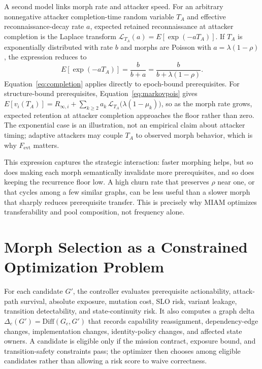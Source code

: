 \documentclass[11pt,letterpaper]{article}
\begin{document}
A second model links morph rate and attacker speed. For an arbitrary nonnegative attacker completion-time random variable $T_A$ and effective reconnaissance-decay rate $a$, expected retained reconnaissance at attacker completion is the Laplace transform $\mathcal{L}_{T_A}(a)=E[\exp(-aT_A)]$. If $T_A$ is exponentially distributed with rate $b$ and morphs are Poisson with $a=\lambda(1-\rho)$, the expression reduces to
\begin{equation}\label{eq:completion}
E[\exp(-aT_A)]=\frac{b}{b+a}=\frac{b}{b+\lambda(1-\rho)}.
\end{equation}
Equation~\eqref{eq:completion} applies directly to epoch-bound prerequisites. For structure-bound prerequisites, Equation~\eqref{eq:markovpois} gives $E[v_i(T_A)]=R_{\infty,i}+\sum_{k\ge2}a_k\,\mathcal{L}_{T_A}\big(\lambda(1-\mu_k)\big)$, so as the morph rate grows, expected retention at attacker completion approaches the floor rather than zero. The exponential case is an illustration, not an empirical claim about attacker timing; adaptive attackers may couple $T_A$ to observed morph behavior, which is why $F_{\mathrm{evt}}$ matters.

This expression captures the strategic interaction: faster morphing helps, but so does making each morph semantically invalidate more prerequisites, and so does keeping the recurrence floor low. A high churn rate that preserves $\rho$ near one, or that cycles among a few similar graphs, can be less useful than a slower morph that sharply reduces prerequisite transfer. This is precisely why MIAM optimizes transferability and pool composition, not frequency alone.

\section{Morph Selection as a Constrained Optimization Problem}\label{sec:opt}

For each candidate $G'$, the controller evaluates prerequisite actionability, attack-path survival, absolute exposure, mutation cost, SLO risk, variant leakage, transition detectability, and state-continuity risk. It also computes a graph delta $\Delta_e(G')=\mathrm{Diff}(G_e,G')$ that records capability reassignment, dependency-edge changes, implementation changes, identity-policy changes, and affected state owners. A candidate is eligible only if the mission contract, exposure bound, and transition-safety constraints pass; the optimizer then chooses among eligible candidates rather than allowing a risk score to waive correctness.
\end{document}
